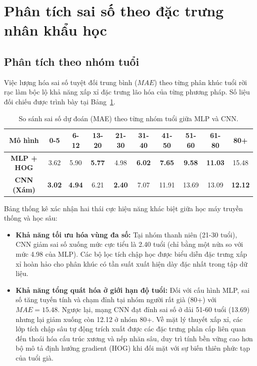 \section{Phân tích sai số theo đặc trưng nhân khẩu học}
\subsection{Phân tích theo nhóm tuổi}
Việc lượng hóa sai số tuyệt đối trung bình ($MAE$) theo từng phân khúc tuổi rời rạc làm bộc lộ khả năng xấp xỉ đặc trưng lão hóa của từng phương pháp. Số liệu đối chiếu được trình bày tại Bảng~\ref{tab:error-by-age}.

\begin{table}[H]
    \centering
    \footnotesize
    \renewcommand{\arraystretch}{1.5}
    \caption{So sánh sai số dự đoán (MAE) theo từng nhóm tuổi giữa MLP và CNN.}
    \label{tab:error-by-age}
    \begin{tabular}{c|ccccccccc}
        \toprule
        \textbf{Mô hình} & \textbf{0-5} & \textbf{6-12} & \textbf{13-20} & \textbf{21-30} & \textbf{31-40} & \textbf{41-50} & \textbf{51-60} & \textbf{61-80} & \textbf{80+} \\
        \midrule
        \textbf{MLP + HOG} & 3.62 & 5.90 & \textbf{5.77} & 4.98 & \textbf{6.02} & \textbf{7.65} & \textbf{9.58} & \textbf{11.03} & 15.48 \\
        \textbf{CNN (Xám)} & \textbf{3.02} & \textbf{4.94} & 6.21 & \textbf{2.40} & 7.07 & 11.91 & 13.69 & 13.09 & \textbf{12.12} \\
        \bottomrule
    \end{tabular}
\end{table}

Bảng thống kê xác nhận hai thái cực hiệu năng khác biệt giữa học máy truyền thống và học sâu:
\begin{itemize}
    \item \textbf{Khả năng tối ưu hóa vùng đa số:} Tại nhóm thanh niên (21-30 tuổi), CNN giảm sai số xuống mức cực tiểu là 2.40 tuổi (chỉ bằng một nửa so với mức 4.98 của MLP). Các bộ lọc tích chập học được biểu diễn đặc trưng xấp xỉ hoàn hảo cho phân khúc có tần suất xuất hiện dày đặc nhất trong tập dữ liệu.
    \item \textbf{Khả năng tổng quát hóa ở giới hạn độ tuổi:} Đối với cấu hình MLP, sai số tăng tuyến tính và chạm đỉnh tại nhóm người rất già (80+) với $MAE = 15.48$. Ngược lại, mạng CNN đạt đỉnh sai số ở dải 51-60 tuổi (13.69) nhưng lại giảm xuống còn 12.12 ở nhóm 80+. Về mặt lý thuyết xấp xỉ, các lớp tích chập sâu tự động trích xuất được các đặc trưng phân cấp liên quan đến thoái hóa cấu trúc xương và nếp nhăn sâu, duy trì tính bền vững cao hơn bộ mô tả định hướng gradient (HOG) khi đối mặt với sự biến thiên phức tạp của tuổi già.
\end{itemize}

